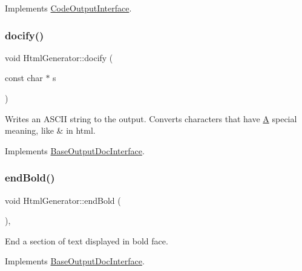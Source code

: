 Implements \mbox{\hyperlink{class_code_output_interface_aa29a5eedda08596ace50ed5b59c8ae7f}{Code\+Output\+Interface}}.

\mbox{\label{class_html_generator_a1f33982a4ce6eac13224197e91f057d8}} 
\subsubsection{\texorpdfstring{docify()}{docify()}}
{\footnotesize\ttfamily void Html\+Generator\+::docify (\begin{DoxyParamCaption}\item[{const char $\ast$}]{s }\end{DoxyParamCaption})\hspace{0.3cm}{\ttfamily [virtual]}}

Writes an A\+S\+C\+II string to the output. Converts characters that have \mbox{\hyperlink{class_a}{A}} special meaning, like {\ttfamily \&} in html. 

Implements \mbox{\hyperlink{class_base_output_doc_interface_ad7d3f6631bd157739170690e669b3e75}{Base\+Output\+Doc\+Interface}}.

\mbox{\label{class_html_generator_a8e60c605c5db7577e2e0256c0431dcb1}} 
\subsubsection{\texorpdfstring{endBold()}{endBold()}}
{\footnotesize\ttfamily void Html\+Generator\+::end\+Bold (\begin{DoxyParamCaption}{ }\end{DoxyParamCaption})\hspace{0.3cm}{\ttfamily [inline]}, {\ttfamily [virtual]}}

End a section of text displayed in bold face. 

Implements \mbox{\hyperlink{class_base_output_doc_interface_a2a17911ba778f8efac83999fb5d190d9}{Base\+Output\+Doc\+Interface}}.

\mbox{\label{class_html_generator_a6df6ede2137490c79228b9825df3b263}} 

